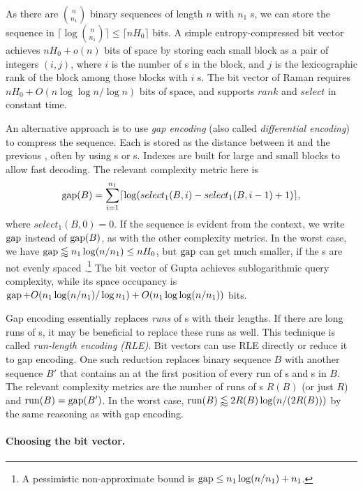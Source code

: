 As there are $\binom{n}{n_{1}}$ binary sequences of length $n$ with $n_{1}$ \onebit{}s, we can store the sequence in $\lceil \log \binom{n}{n_{1}} \rceil \le \lceil nH_{0} \rceil$ bits. A simple entropy-compressed bit vector achieves $nH_{0} + o(n)$ bits of space by storing each small block as a pair of integers $(i, j)$, where $i$ is the number of \onebit{}s in the block, and $j$ is the lexicographic rank of the block among those blocks with $i$ \onebit{}s. The bit vector of Raman  requires $nH_{0} + O(n \log \log n / \log n)$ bits of space, and supports $rank$ and $select$ in constant time.

An alternative approach is to use \emph{gap encoding} (also called \emph{differential encoding}) to compress the sequence. Each \onebit{} is stored as the distance between it and the previous \onebit, often by using \gammacode{}s or \deltacode{}s. Indexes are built for large and small blocks to allow fast decoding. The relevant complexity metric here is 
$$
\operatorname{gap}(B) = \sum_{i=1}^{n_{1}} \lceil \log(select_{1}(B, i) - select_{1}(B, i-1) + 1) \rceil,
$$
where $select_{1}(B, 0) = 0$. If the sequence is evident from the context, we write $\operatorname{gap}$ instead of $\operatorname{gap}(B)$, as with the other complexity metrics. In the worst case, we have $\operatorname{gap} \lessapprox n_{1} \log (n / n_{1}) \le nH_{0}$, but $\operatorname{gap}$ can get much smaller, if the \onebit{}s are not evenly spaced \cite{Gupta2007}.\footnote{A pessimistic non-approximate bound is $\operatorname{gap} \le n_{1} \log (n / n_{1}) + n_{1}$.} The bit vector of Gupta  achieves sublogarithmic query complexity, while its space occupancy is $\operatorname{gap} + O(n_{1} \log (n / n_{1}) / \log n_{1}) + O(n_{1} \log \log (n / n_{1}))$ bits.

Gap encoding essentially replaces \emph{runs} of \zerobit{}s with their lengths. If there are long runs of \onebit{}s, it may be beneficial to replace these runs as well. This technique is called \emph{run-length encoding (RLE)}. Bit vectors can use RLE directly or reduce it to gap encoding. One such reduction replaces binary sequence $B$ with another sequence $B'$ that contains an \onebit{} at the first position of every run of \zerobit{}s and \onebit{}s in $B$. The relevant complexity metrics are the number of runs of \onebit{}s $R(B)$ (or just $R$) and $\operatorname{run}(B) = \operatorname{gap}(B')$. In the worst case, $\operatorname{run}(B) \lessapprox 2R(B) \log (n / (2R(B)))$ by the same reasoning as with gap encoding.

\paragraph{Choosing the bit vector.}

